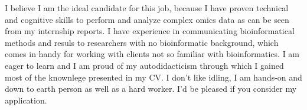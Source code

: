 \documentclass[11pt, a4paper]{awesome-cv}
\begin{document}
\begin{cvletter}
I believe I am the ideal candidate for this job, because I have proven technical and cognitive skills to perform and analyze complex omics data as can be seen from my internship reports.
I have experience in communicating bioinformatical methods and resuls to researchers with no bioinformatic background, which comes in handy for working with clients not so familiar with bioinformatics. 
I am eager to learn and I am proud of my autodidacticism through which I gained most of the knownlege presented in my CV.
I don't like idling, I am hands-on and down to earth person as well as a hard worker.
I'd be pleased if you consider my application.

\end{cvletter}


\makeletterclosing
\end{document}
